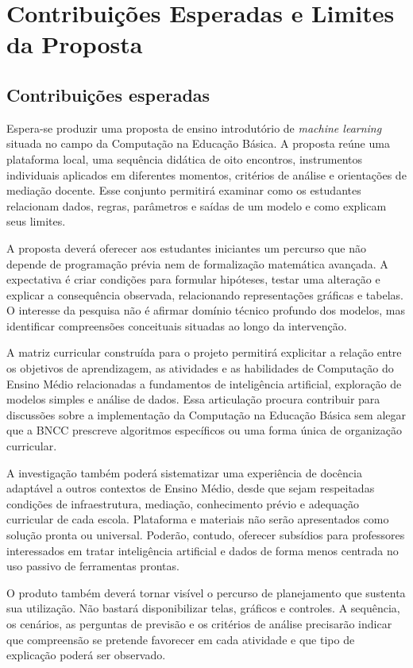 \chapter{Contribuições Esperadas e Limites da Proposta}

\section{Contribuições esperadas}

Espera-se produzir uma proposta de ensino introdutório de \textit{machine learning} situada no campo da Computação na Educação Básica. A proposta reúne uma plataforma local, uma sequência didática de oito encontros, instrumentos individuais aplicados em diferentes momentos, critérios de análise e orientações de mediação docente. Esse conjunto permitirá examinar como os estudantes relacionam dados, regras, parâmetros e saídas de um modelo e como explicam seus limites.

A proposta deverá oferecer aos estudantes iniciantes um percurso que não depende de programação prévia nem de formalização matemática avançada. A expectativa é criar condições para formular hipóteses, testar uma alteração e explicar a consequência observada, relacionando representações gráficas e tabelas. O interesse da pesquisa não é afirmar domínio técnico profundo dos modelos, mas identificar compreensões conceituais situadas ao longo da intervenção.

A matriz curricular construída para o projeto permitirá explicitar a relação entre os objetivos de aprendizagem, as atividades e as habilidades de Computação do Ensino Médio relacionadas a fundamentos de inteligência artificial, exploração de modelos simples e análise de dados. Essa articulação procura contribuir para discussões sobre a implementação da Computação na Educação Básica sem alegar que a BNCC prescreve algoritmos específicos ou uma forma única de organização curricular.

A investigação também poderá sistematizar uma experiência de docência adaptável a outros contextos de Ensino Médio, desde que sejam respeitadas condições de infraestrutura, mediação, conhecimento prévio e adequação curricular de cada escola. Plataforma e materiais não serão apresentados como solução pronta ou universal. Poderão, contudo, oferecer subsídios para professores interessados em tratar inteligência artificial e dados de forma menos centrada no uso passivo de ferramentas prontas.

O produto também deverá tornar visível o percurso de planejamento que sustenta sua utilização. Não bastará disponibilizar telas, gráficos e controles. A sequência, os cenários, as perguntas de previsão e os critérios de análise precisarão indicar que compreensão se pretende favorecer em cada atividade e que tipo de explicação poderá ser observado.

